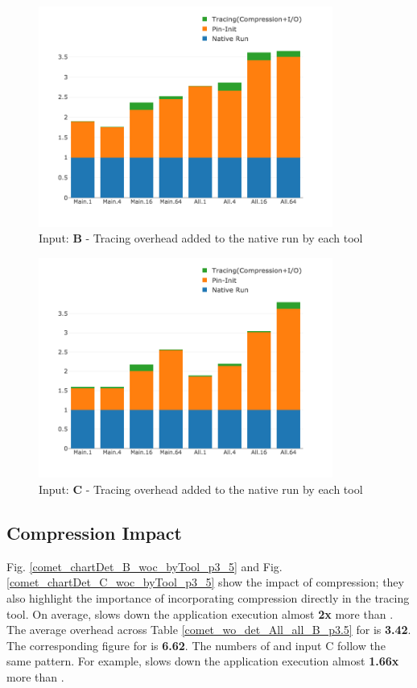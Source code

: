 \begin{figure}[t]
\centering
\includegraphics[width=3.8in]{figs.comet.newMed/comet_chartDet_B_wc_byTool_p3_5.png}
\caption{ Input: \textbf{B} - Tracing overhead added to the native run by each tool}
\label{comet_chartDet_B_wc_byTool_p3_5}
\end{figure}


\begin{figure}[t]
\centering
\includegraphics[width=3.8in]{figs.comet.newMed/comet_chartDet_C_wc_byTool_p3_5.png}
\caption{ Input: \textbf{C} - Tracing overhead added to the native run by each tool
}
\label{comet_chartDet_C_wc_byTool_p3_5}
\end{figure}






\subsection{Compression Impact} 
\label{subsec:compact}

Fig. \ref{comet_chartDet_B_woc_byTool_p3_5} and Fig. \ref{comet_chartDet_C_woc_byTool_p3_5} show the 
impact of compression; they also highlight the importance of incorporating compression directly in the tracing
tool. 
%
On average, \parlotnc slows down the application execution almost \textbf{2x} more than \parlota. 
%
The average overhead 
across Table \ref{comet_wo_det_All_all_B_p3.5} for \parlota is \textbf{3.42}.
%
The  corresponding figure for \parlotnc is \textbf{6.62}. 
%
The numbers of \parlotm and input C  follow the same pattern. For example, \parlotnc slows down the application execution almost \textbf{1.66x} more than \parlotm.
%

